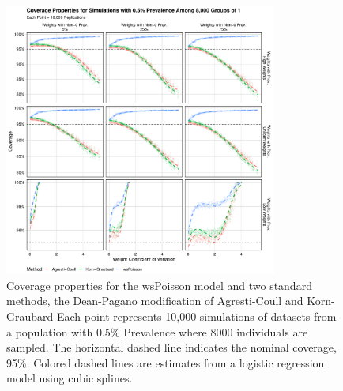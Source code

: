 \documentclass[AMA,STIX1COL]{WileyNJD-v2}
\begin{document}
\begin{figure}
\centering
\includegraphics[width=0.8\textwidth]{figures/perfect_coverage_8000_groups_0_005_prev.pdf}
\caption{Coverage properties for the wsPoisson model and two standard methods, the Dean-Pagano modification of Agresti-Coull and Korn-Graubard
Each point represents 10,000 simulations of datasets from a population with 0.5\% Prevalence where 8000 individuals are sampled.
The horizontal dashed line indicates the nominal coverage, 95\%.
Colored dashed lines are estimates from a logistic regression model using cubic splines.}
\label{fig:perfect_coverage_8000_groups_0_005_prev}
\end{figure}
\end{document}
